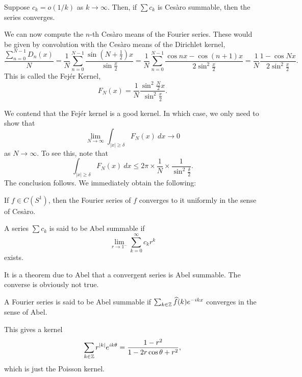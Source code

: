 \begin{example}
    Suppose $c_k = o\left(1/k\right)$ as $k\to\infty$. Then, if $\sum c_k$ is Ces\`aro summable, then the series converges.
\end{example}

We can now compute the $n$-th Ces\`aro means of the Fourier series. These would be given by convolution with the Ces\`aro means of the Dirichlet kernel, 
\begin{equation*}
    \frac{\sum_{n = 0}^{N - 1}D_n(x)}{N} = \frac{1}{N}\sum_{n = 0}^{N - 1}\frac{\sin\left(N + \frac{1}{2}\right)x}{\sin\frac{x}{2}} = \frac{1}{N}\sum_{n = 0}^{N - 1}\frac{\cos nx - \cos (n + 1)x}{2\sin^2\frac{x}{2}} = \frac{1}{N}\frac{1 - \cos Nx}{2\sin^2\frac{x}{2}}.
\end{equation*}
This is called the Fej\'er Kernel, 
\begin{equation*}
    F_N(x) = \frac{1}{N}\frac{\sin^2\frac{N}{2}x}{\sin^2\frac{x}{2}}.
\end{equation*}

We contend that the Fej\'er kernel is a good kernel. In which case, we only need to show that 
\begin{equation*}
    \lim_{N\to\infty}\int_{|x|\ge\delta}F_N(x)~dx\to 0
\end{equation*}
as $N\to\infty$. To see this, note that 
\begin{equation*}
    \int_{|x|\ge\delta}F_N(x)~dx\le 2\pi\times\frac{1}{N}\times\frac{1}{\sin^2\frac{\delta}{2}}.
\end{equation*}
The conclusion follows. We immediately obtain the following:

\begin{theorem}
    If $f\in C(S^1)$, then the Fourier series of $f$ converges to it uniformly in the sense of Ces\`aro. 
\end{theorem}

\begin{definition}
    A series $\sum c_k$ is said to be Abel summable if 
    \begin{equation*}
        \lim_{r\to 1^-}\sum_{k = 0}^\infty c_k r^k 
    \end{equation*}
    exists.
\end{definition}

It is a theorem due to Abel that a convergent series is Abel summable. The converse is obviously not true.

\begin{definition}
    A Fourier series is said to be Abel summable if $\sum_{k\in\mathbb{Z}}\widehat{f}(k)e^{-ikx}$ converges in the sense of Abel.
\end{definition}

This gives a kernel 
\begin{equation*}
    \sum_{k\in\mathbb{Z}}r^{|k|}e^{ik\theta} = \frac{1 - r^2}{1 - 2r\cos\theta + r^2},
\end{equation*}
which is just the Poisson kernel.